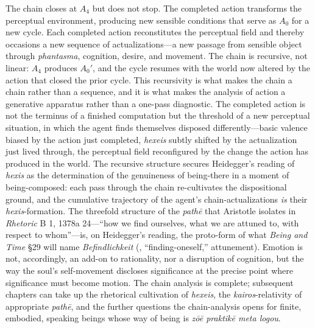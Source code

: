 The chain closes at $A_4$ but does not stop. The completed action transforms the perceptual environment, producing new sensible conditions that serve as $A_0$ for a new cycle. Each completed action reconstitutes the perceptual field and thereby occasions a new sequence of actualizations---a new passage from sensible object through \textit{phantasma}, cognition, desire, and movement. The chain is recursive, not linear: $A_4$ produces $A_0'$, and the cycle resumes with the world now altered by the action that closed the prior cycle. This recursivity is what makes the chain a chain rather than a sequence, and it is what makes the analysis of action a generative apparatus rather than a one-pass diagnostic. The completed action is not the terminus of a finished computation but the threshold of a new perceptual situation, in which the agent finds themselves disposed differently---basic valence biased by the action just completed, \textit{hexeis} subtly shifted by the actualization just lived through, the perceptual field reconfigured by the change the action has produced in the world. The recursive structure secures Heidegger's reading of \textit{hexis} as the determination of the genuineness of being-there in a moment of being-composed: each pass through the chain re-cultivates the dispositional ground, and the cumulative trajectory of the agent's chain-actualizations \textit{is} their \textit{hexis}-formation. The threefold structure of the \textit{pathē} that Aristotle isolates in \textit{Rhetoric} B 1, 1378a 24---``how we find ourselves, what we are attuned to, with respect to whom''---is, on Heidegger's reading, the proto-form of what \textit{Being and Time} §29 will name \textit{Befindlichkeit} (, ``finding-oneself,'' attunement). Emotion is not, accordingly, an add-on to rationality, nor a disruption of cognition, but the way the soul's self-movement discloses significance at the precise point where significance must become motion. The chain analysis is complete; subsequent chapters can take up the rhetorical cultivation of \textit{hexeis}, the \textit{kairos}-relativity of appropriate \textit{pathē}, and the further questions the chain-analysis opens for finite, embodied, speaking beings whose way of being is \textit{zōē praktikē meta logou}.
